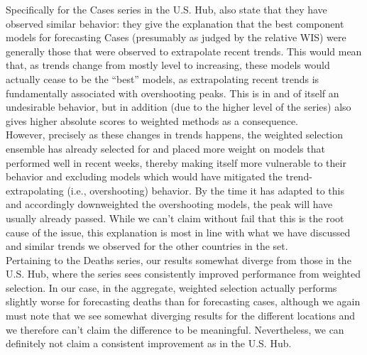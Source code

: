 Specifically for the Cases series in the U.S. Hub, \cite{ray_comparing_2022} also state that they have observed similar behavior: they give the explanation that the best component models for forecasting Cases (presumably as judged by the relative WIS) were generally those that were observed to extrapolate recent trends. This would mean that, as trends change from mostly level to increasing, these models would actually cease to be the ``best'' models, as extrapolating recent trends is fundamentally associated with overshooting peaks. This is in and of itself an undesirable behavior, but in addition (due to the higher level of the series) also gives higher absolute scores to weighted methods as a consequence.\\
However, precisely as these changes in trends happens, the weighted selection ensemble has already selected for and placed more weight on models that performed well in recent weeks, thereby making itself more vulnerable to their behavior and excluding models which would have mitigated the trend-extrapolating (i.e., overshooting) behavior. By the time it has adapted to this and accordingly downweighted the overshooting models, the peak will have usually already passed. While we can't claim without fail that this is the root cause of the issue, this explanation is most in line with what we have discussed and similar trends we observed for the other countries in the set.\\
Pertaining to the Deaths series, our results somewhat diverge from those in the U.S. Hub, where the series sees consistently improved performance from weighted selection. In our case, in the aggregate, weighted selection actually performs slightly worse for forecasting deaths than for forecasting cases, although we again must note that we see somewhat diverging results for the different locations and we therefore can't claim the difference to be meaningful. Nevertheless, we can definitely not claim a consistent improvement as in the U.S. Hub. \medskip\\
